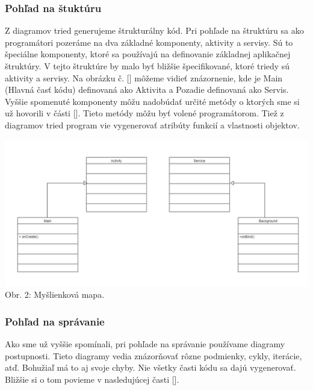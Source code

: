 \documentclass[10pt,twoside,slovak,a4paper]{article}
\begin{document}
\subsubsection{Pohľad na štuktúru}\label{MDE spôsob pre Android:Modelovanie:Pohľad na štuktúru}
Z diagramov tried generujeme štrukturálny kód. Pri pohľade na štruktúru sa ako programátori pozeráme na dva základné komponenty,  aktivity a servisy. Sú to špeciálne komponenty, ktoré sa používajú na definovanie základnej aplikačnej štruktúry. V tejto štruktúre by malo byť bližšie špecifikované, ktoré triedy sú aktivity a servisy. Na obrázku č. [] môžeme vidieť znázornenie, kde je Main (Hlavná časť kódu) definovaná ako Aktivita a Pozadie definovaná ako Servis. \newline
Vyššie spomenuté komponenty môžu nadobúdať určité metódy o ktorých sme si už hovorili v části []. Tieto metódy môžu byť volené programátorom.\newline
Tiež z diagramov tried program vie vygenerovať atribúty funkcií a vlastnosti objektov.
\begin{center}
\includegraphics[scale=0.5]{diagram.png}
Obr. 2: Myšlienková mapa.
\end{center}

\subsubsection{Pohľad na správanie}\label{MDE spôsob pre Android:Modelovanie:Pohľad na správanie}
Ako sme už vyššie spomínali, pri pohľade na správanie používame diagramy postupnosti. Tieto diagramy vedia znázorňovať rôzne podmienky, cykly, iterácie, atď. Bohužiaľ má to aj svoje chyby. Nie všetky časti kódu sa dajú vygenerovať. Bližšie si o tom povieme v nasledujúcej časti [].
\end{document}
